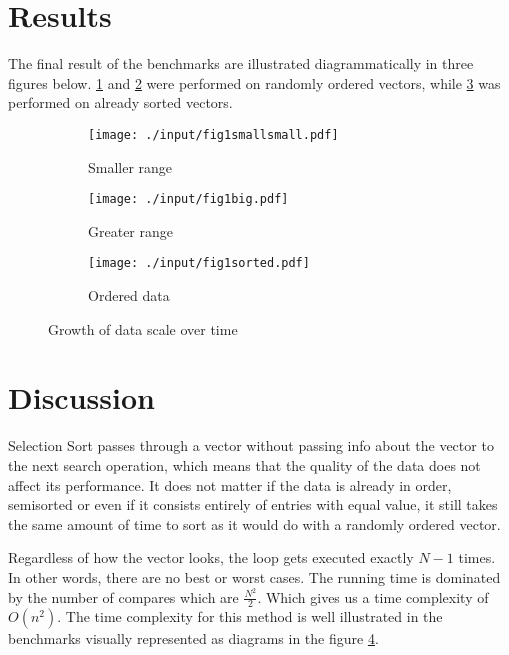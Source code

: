 \documentclass[a4paper, 11pt]{article}
\begin{document}
    \section*{Results}
    The final result of the benchmarks are illustrated diagrammatically 
    in three figures below. \ref{fig:smaldata} and \ref{fig:bigdata} were 
    performed on randomly ordered vectors, while \ref{fig:sorted} was 
    performed on already sorted vectors. 
\begin{figure}[h]
    \centering
    \begin{subfigure}[h]{0.45\textwidth}
        \centering
        \texttt{[image: ./input/fig1smallsmall.pdf]}
        \caption{Smaller range}
        \label{fig:smaldata}
    \end{subfigure}
    \hfill
    \begin{subfigure}[h]{0.45\textwidth}
        \centering
        \texttt{[image: ./input/fig1big.pdf]}
        \caption{Greater range}
        \label{fig:bigdata}
    \end{subfigure}
    \begin{subfigure}[h]{0.45\textwidth}
        \centering
        \texttt{[image: ./input/fig1sorted.pdf]}
        \caption{Ordered data}
        \label{fig:sorted}
    \end{subfigure}
    \caption{Growth of data scale over time}
    \label{fig:benchmarks}
\end{figure}

    \section*{Discussion}
    Selection Sort passes through a vector without passing info about the vector to
    the next search operation, which means that the quality of the data does not
    affect its performance. It does not matter if the data is already in order, 
    semisorted or even if it consists entirely of entries with equal value, 
    it still takes the same amount of time to sort as it would do with a 
    randomly ordered vector. 
    
    Regardless of how the vector looks, the loop gets 
    executed exactly $N-1$ times. In other words, there are no best or worst cases. 
    The running time is
    dominated by the number of compares which are $\frac{N^2}{2}$. 
    Which gives us a time complexity of $O(n^2)$. The time complexity for
    this method is well illustrated in the benchmarks visually represented as 
    diagrams in the figure \ref{fig:benchmarks}. 
\end{document}
